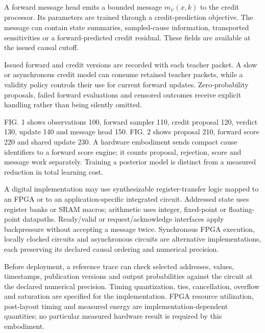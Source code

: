 \documentclass[pct]{sm-patent}
\begin{document}
\pnum A forward message head emits a bounded message $m_\psi(x,k)$ to the credit processor. Its parameters are trained through a credit-prediction objective. The message can contain state summaries, sampled-cause information, transported sensitivities or a forward-predicted credit residual. These fields are available at the issued causal cutoff.

\pnum Issued forward and credit versions are recorded with each teacher packet. A slow or asynchronous credit model can consume retained teacher packets, while a validity policy controls their use for current forward updates. Zero-probability proposals, failed forward evaluations and censored outcomes receive explicit handling rather than being silently omitted.

\pnum FIG. 1 shows observations 100, forward sampler 110, credit proposal 120, verdict 130, update 140 and message head 150. FIG. 2 shows proposal 210, forward score 220 and shared update 230. A hardware embodiment sends compact cause identifiers to a forward score engine; it counts proposal, rejection, score and message work separately. Training a posterior model is distinct from a measured reduction in total learning cost.


\pnum A digital implementation may use synthesizable register-transfer logic mapped to an FPGA or to an application-specific integrated circuit. Addressed state uses register banks or SRAM macros; arithmetic uses integer, fixed-point or floating-point datapaths. Ready/valid or request/acknowledge interfaces apply backpressure without accepting a message twice. Synchronous FPGA execution, locally clocked circuits and asynchronous circuits are alternative implementations, each preserving its declared causal ordering and numerical precision.

\pnum Before deployment, a reference trace can check selected addresses, values, timestamps, publication versions and output probabilities against the circuit at the declared numerical precision. Timing quantization, ties, cancellation, overflow and saturation are specified for the implementation. FPGA resource utilization, post-layout timing and measured energy are implementation-dependent quantities; no particular measured hardware result is required by this embodiment.

\claimsstart
\end{document}
